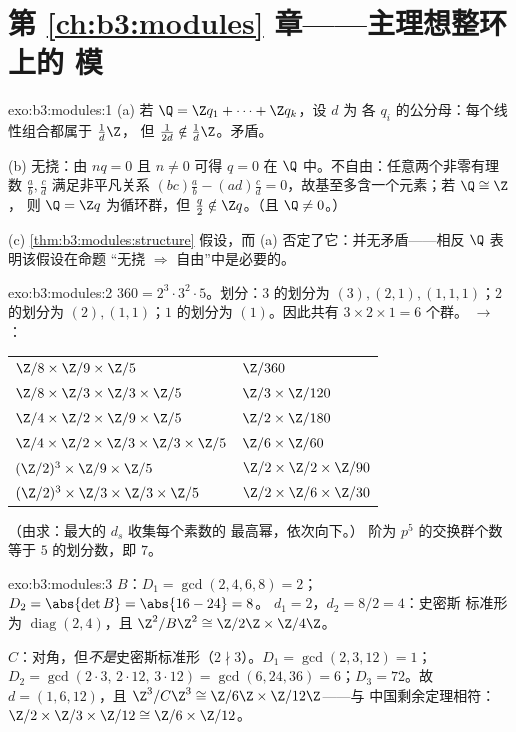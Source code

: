 \section*{第 \ref{ch:b3:modules} 章——主理想整环上的
模}

\begin{solution}{exo:b3:modules:1}
(a) 若 $\Q = \Z q_1 + \dots + \Z q_k$，设 $d$ 为
各 $q_i$ 的公分母：每个线性组合都属于 $\frac1d\Z$，
但 $\frac1{2d} \notin \frac1d\Z$。矛盾。

(b) 无挠：由 $nq = 0$ 且 $n \neq 0$ 可得 $q = 0$
在 $\Q$ 中。不自由：任意两个非零有理数 $\frac ab, \frac cd$
满足非平凡关系 $(bc)\frac ab - (ad)\frac cd =
0$，故基至多含一个元素；若 $\Q \cong \Z$，
则 $\Q = \Z q$ 为循环群，但 $\frac q2 \notin \Z q$。（且 $\Q \neq
0$。）

(c) \cref{thm:b3:modules:structure} 假设\emph{}，而 (a) 否定了它：并无矛盾——相反 $\Q$
表明该假设在命题
“无挠 $\Rightarrow$ 自由”中是必要的。
\end{solution}

\begin{solution}{exo:b3:modules:2}
$360 = 2^3\cdot3^2\cdot5$。划分：$3$ 的划分为 $(3), (2,1),
(1,1,1)$；$2$ 的划分为 $(2), (1,1)$；$1$ 的划分为 $(1)$。因此共有 $3 \times 2
\times 1 = 6$ 个群。 $\to$
：
\begin{center}
\begin{tabular}{l l}
$\Z/8 \times \Z/9 \times \Z/5$ & $\Z/360$\\
$\Z/8 \times \Z/3 \times \Z/3 \times \Z/5$ & $\Z/3 \times
\Z/120$\\
$\Z/4 \times \Z/2 \times \Z/9 \times \Z/5$ & $\Z/2 \times
\Z/180$\\
$\Z/4 \times \Z/2 \times \Z/3 \times \Z/3 \times \Z/5$ & $\Z/6
\times \Z/60$\\
$(\Z/2)^3 \times \Z/9 \times \Z/5$ & $\Z/2 \times \Z/2 \times
\Z/90$\\
$(\Z/2)^3 \times \Z/3 \times \Z/3 \times \Z/5$ & $\Z/2 \times
\Z/6 \times \Z/30$
\end{tabular}
\end{center}
（由求：最大的 $d_s$ 收集每个素数的
最高幂，依次向下。）
阶为 $p^5$ 的交换群个数等于 $5$ 的划分数，即 $7$。
\end{solution}

\begin{solution}{exo:b3:modules:3}
$B$：$D_1 = \gcd(2,4,6,8) = 2$；$D_2 = \abs{\det B} = \abs{16 -
24} = 8$。 $d_1 = 2$，$d_2 = 8/2 = 4$：史密斯
标准形为 $\operatorname{diag}(2, 4)$，且 $\Z^2/B\Z^2 \cong \Z/2\Z
\times \Z/4\Z$。

$C$：对角，但\emph{不是}史密斯标准形（$2 \nmid 3$）。$D_1 =
\gcd(2,3,12) = 1$；$D_2 = \gcd(2\cdot3,\, 2\cdot12,\, 3\cdot12) =
\gcd(6, 24, 36) = 6$；$D_3 = 72$。故 $d = (1, 6, 12)$，且
$\Z^3/C\Z^3 \cong \Z/6\Z\times\Z/12\Z$——与
中国剩余定理相符：$\Z/2\times\Z/3\times\Z/12 \cong \Z/6\times\Z/12$。
\end{solution}

